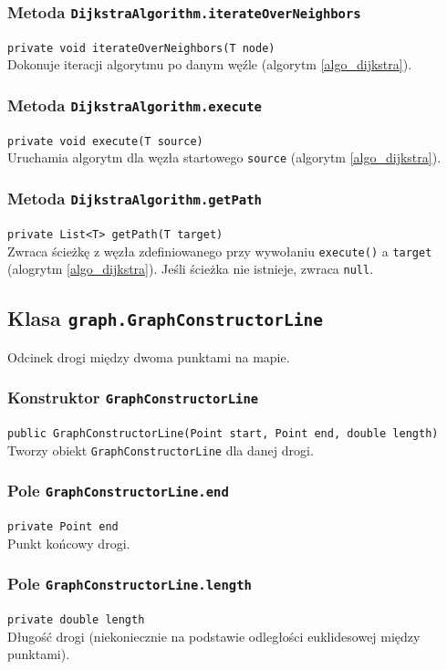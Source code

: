 \documentclass{article}
\begin{document}
\subsubsection{Metoda \texttt{DijkstraAlgorithm.iterateOverNeighbors}}
\texttt{private void iterateOverNeighbors(T node)} \\
Dokonuje iteracji algorytmu po danym węźle (algorytm \ref{algo_dijkstra}).

\subsubsection{Metoda \texttt{DijkstraAlgorithm.execute}}
\texttt{private void execute(T source)} \\
Uruchamia algorytm dla węzła startowego \texttt{source} (algorytm \ref{algo_dijkstra}).

\subsubsection{Metoda \texttt{DijkstraAlgorithm.getPath}}
\texttt{private List<T> getPath(T target)} \\
Zwraca ścieżkę z węzła zdefiniowanego przy wywołaniu \texttt{execute()} a  \texttt{target} (alogrytm \ref{algo_dijkstra}). Jeśli ścieżka nie istnieje, zwraca \texttt{null}.

\subsection{Klasa \texttt{graph.GraphConstructorLine}}
Odcinek drogi między dwoma punktami na mapie.

\subsubsection{Konstruktor \texttt{GraphConstructorLine}}
\texttt{public GraphConstructorLine(Point start, Point end, double length)} \\
Tworzy obiekt \texttt{GraphConstructorLine} dla danej drogi.

\subsubsection{Pole \texttt{GraphConstructorLine.end}}
\texttt{private Point end} \\
Punkt końcowy drogi.

\subsubsection{Pole \texttt{GraphConstructorLine.length}}
\texttt{private double length} \\
Długość drogi (niekoniecznie na podstawie odległości euklidesowej między punktami).
\end{document}
